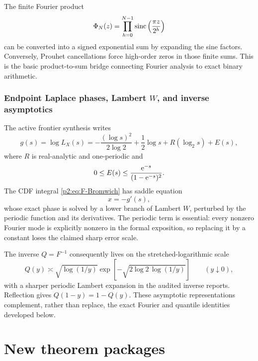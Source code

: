 \documentclass[11pt]{article}
\theoremstyle{definition}
\theoremstyle{remark}
\begin{document}
The finite Fourier product
\begin{equation}
 \Phi_N(z)=\prod_{h=0}^{N-1}\operatorname{sinc}\left(\frac{\pi z}{2^h}\right)           \label{p2:eq:PhiN}
\end{equation}
can be converted into a signed exponential sum by expanding the sine factors.  Conversely,
Prouhet cancellations force high-order zeros in those finite sums.  This is the basic
product-to-sum bridge connecting Fourier analysis to exact binary arithmetic.

\section{Endpoint Laplace phases, Lambert \texorpdfstring{$W$}{W}, and inverse asymptotics}
\label{p2:sec:endpoint}

The active frontier synthesis writes
\begin{equation}
 g(s)=\log L_X(s)
 =-\frac{(\log s)^2}{2\log2}+\frac12\log s
   +R(\log_2s)+E(s),                                     \label{p2:eq:g-decomp}
\end{equation}
where $R$ is real-analytic and one-periodic and
\begin{equation}
 0\le E(s)\le\frac{\mathrm e^{-s}}{(1-\mathrm e^{-s})^2}.              \label{p2:eq:E-bound}
\end{equation}
The CDF integral \eqref{p2:eq:F-Bromwich} has saddle equation
\begin{equation}
 x=-g'(s),                                                \label{p2:eq:saddle-eq}
\end{equation}
whose exact phase is solved by a lower branch of Lambert $W$, perturbed by the periodic
function and its derivatives.  The periodic term is essential: every nonzero Fourier mode is
explicitly nonzero in the formal exposition, so replacing it by a constant loses the claimed
sharp error scale.

The inverse $Q=F^{-1}$ consequently lives on the stretched-logarithmic scale
\begin{equation}
 Q(y)\asymp
 \sqrt{\log(1/y)}
 \exp\left[-\sqrt{2\log2\,\log(1/y)}\right]
 \qquad(y\downarrow0),                                  \label{p2:eq:Q-scale}
\end{equation}
with a sharper periodic Lambert expansion in the audited inverse reports.  Reflection gives
$Q(1-y)=1-Q(y)$.  These asymptotic representations complement, rather than replace, the exact
Fourier and quantile identities developed below.

\clearpage
\part*{New theorem packages}
\end{document}
